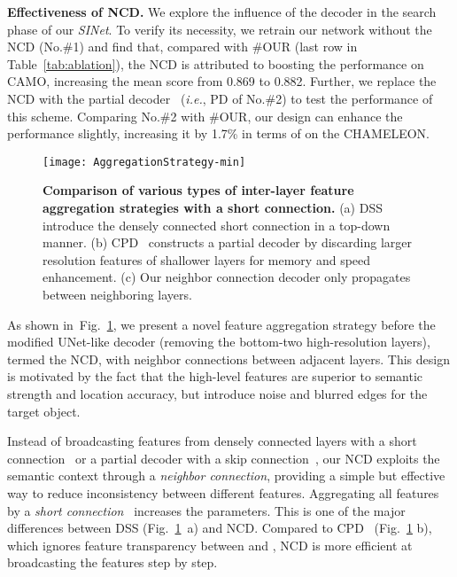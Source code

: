 \documentclass[10pt,journal,compsoc]{IEEEtran}
\def\ie{\emph{i.e.}}
\newcommand{\myPara}[1]{\vspace{6pt}\noindent\textbf{#1}\qquad }
\newcommand{\figref}[1]{Fig.~\ref{#1}}
\newcommand{\tabref}[1]{Table~\ref{#1}}
\def\ournewmodel{\emph{SINet}}
\begin{document}
\myPara{Effectiveness of NCD.}
We explore the influence of the decoder in the search phase of our 
\ournewmodel. 
To verify its necessity, we retrain our network without the NCD (No.\#1) 
and find that, compared with \#OUR (last row in \tabref{tab:ablation}), 
the NCD is attributed to boosting the performance on CAMO, 
increasing the mean  score from 0.869 to 0.882. 
Further, we replace the NCD with the partial decoder~\cite{wu2019cascaded} 
(\ie, PD of No.\#2) to test the performance of this scheme.
Comparing No.\#2 with \#OUR, our design can enhance the performance slightly, 
increasing it by 1.7\% in terms of  on the CHAMELEON.


\begin{figure}[t!]
  \centering
  \texttt{[image: AggregationStrategy-min]}\\
  \vspace{-12pt}
  \caption{\textbf{Comparison of various types of inter-layer feature 
    aggregation strategies with a short connection.} 
    (a) DSS~\cite{HouPami19Dss} introduce the densely connected short 
    connection in a top-down manner. 
    (b) CPD~\cite{wu2019cascaded} constructs a partial decoder by discarding 
    larger resolution features of shallower layers for memory and speed 
    enhancement. 
    (c) Our neighbor connection decoder only propagates between neighboring
    layers. 
  }\label{fig:agg_strategy}
\end{figure}

As shown in~\figref{fig:agg_strategy}, we present a novel feature aggregation
strategy before the modified UNet-like decoder 
(removing the bottom-two high-resolution layers), termed the NCD, 
with neighbor connections between adjacent layers. 
This design is motivated by the fact that the high-level features are superior 
to semantic strength and location accuracy, 
but introduce noise and blurred edges for the target object.

Instead of broadcasting features from densely connected layers with a short 
connection~\cite{HouPami19Dss} or a partial decoder with a 
skip connection~\cite{wu2019cascaded}, 
our NCD exploits the semantic context through a \textit{neighbor connection},
providing a simple but effective way to reduce inconsistency between 
different features.
Aggregating all features by a \textit{short connection}~\cite{HouPami19Dss} 
increases the parameters. 
This is one of the major differences between DSS (\figref{fig:agg_strategy}~a) 
and NCD. 
Compared to CPD~\cite{wu2019cascaded} (\figref{fig:agg_strategy} b), 
which ignores feature transparency between  and , 
NCD is more efficient at broadcasting the features step by step.
\end{document}
